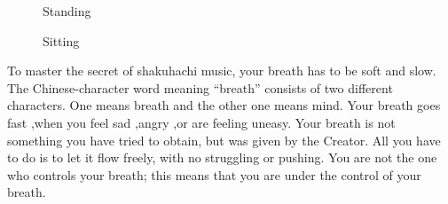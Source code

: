 ﻿\begin{figure}
\centering
\begin{minipage}{0.4\textwidth}
\centering
\caption{Standing} \label{fig:standing}
\end{minipage}
\hfill
\begin{minipage}{0.4\textwidth}
\centering
\caption{Sitting} \label{fig:sitting}
\end{minipage}
\end{figure}

To master the secret of shakuhachi music, your breath has to be soft and slow.
The Chinese-character word meaning “breath” consists of two different characters.
One means breath and the other one means mind.
Your breath goes fast ,when you feel sad ,angry ,or are feeling uneasy.
Your breath is not something you have tried to obtain, but was given by the Creator.
All you have to do is to let it flow freely, with no struggling or pushing.
You are not the one who controls your breath; this means that you are under the control of your breath.


